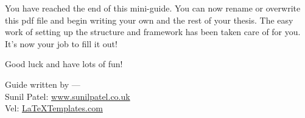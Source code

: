 You have reached the end of this mini-guide. You can now rename or overwrite
this pdf file and begin writing your own  and the rest of
your thesis. The easy work of setting up the structure and framework has been
taken care of for you. It's now your job to fill it out!

Good luck and have lots of fun!

\begin{flushright}
Guide written by ---\\
Sunil Patel: \href{http://www.sunilpatel.co.uk}{www.sunilpatel.co.uk}\\
Vel: \href{http://www.LaTeXTemplates.com}{LaTeXTemplates.com}
\end{flushright}
